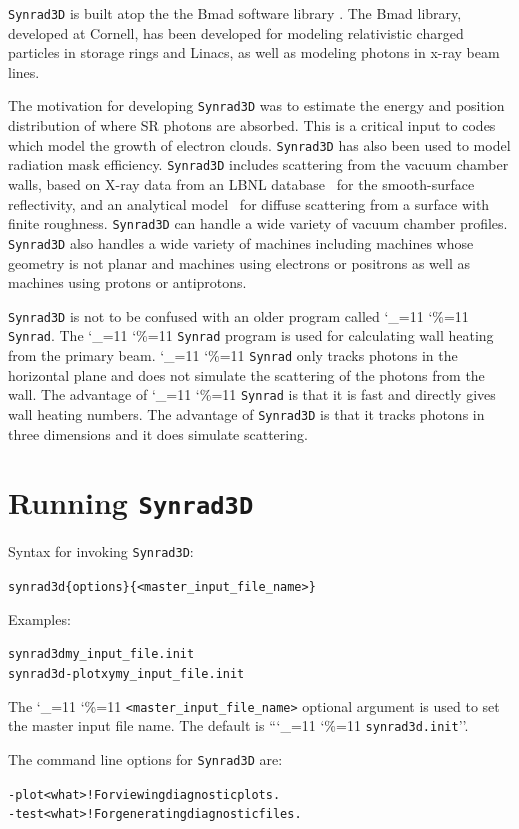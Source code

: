 \documentclass[11pt,openany]{report}
\newcommand{\srthree}{\texttt{Synrad3D}\xspace}
\newcommand\ttcmd{\begingroup\catcode`\_=11 \catcode`\%=11 \dottcmd}
\newcommand\dottcmd[1]{\texttt{#1}\endgroup}
\newcommand{\vn}{\ttcmd}
\newlength{\ExBeg}
\newlength{\ExEnd}
\newenvironment{example}
  {\vspace{\ExBeg} \begin{alltt}}
  {\end{alltt} \vspace{\ExEnd}}
\begin{document}
\srthree is built atop the the Bmad software library
\cite{b:bmad}. The Bmad library, developed at Cornell, has been
developed for modeling relativistic charged particles in storage rings
and Linacs, as well as modeling photons in x-ray beam lines.

The motivation for developing \srthree was to estimate the energy and
position distribution of where SR photons are absorbed. This is a
critical input to codes which model the growth of electron clouds.
\srthree has also been used to model radiation mask efficiency.
\srthree includes scattering from the vacuum chamber walls, based on
X-ray data from an LBNL database~\cite{b:henke} for the smooth-surface
reflectivity, and an analytical model~\cite{b:beckmann,b:ogilvy} for
diffuse scattering from a surface with finite roughness. \srthree can
handle a wide variety of vacuum chamber profiles. \srthree also
handles a wide variety of machines including machines whose geometry
is not planar and machines using electrons or positrons as well as
machines using protons or antiprotons.

\srthree is not to be confused with an older program called
\vn{Synrad}. The \vn{Synrad} program is used for calculating wall
heating from the primary beam. \vn{Synrad} only tracks photons in the
horizontal plane and does not simulate the scattering of the photons
from the wall. The advantage of \vn{Synrad} is that it is fast and
directly gives wall heating numbers. The advantage of \srthree is that
it tracks photons in three dimensions and it does simulate scattering.

\chapter{Running \srthree} 
\label{s:run}

Syntax for invoking \srthree:
\begin{example}
  synrad3d \{options\} \{<master_input_file_name>\}
\end{example}
Examples:
\begin{example}
  synrad3d my_input_file.init
  synrad3d -plot xy  my_input_file.init
\end{example}

The \vn{<master_input_file_name>} optional argument is used to set the
master input file name. The default is ``\vn{synrad3d.init}''. 

The command line options for \srthree are:
\begin{example}
  -plot <what>  ! For viewing diagnostic plots.
  -test <what>  ! For generating diagnostic files.
\end{example}
\end{document}
